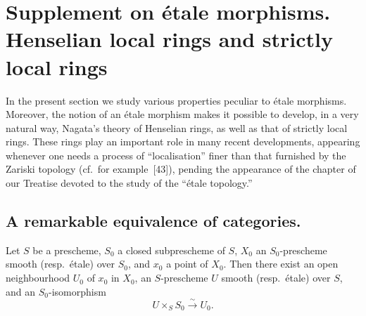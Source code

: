 \section{Supplement on \'etale morphisms. Henselian local rings and strictly local rings}
\label{section:IV.18}

In the present section we study various properties peculiar to \'etale morphisms.  Moreover, the notion of an \'etale morphism makes it possible to develop, in a very natural way, Nagata's theory of Henselian rings, as well as that of strictly local rings.  These rings play an important role in many recent developments, appearing whenever one needs a process of ``localisation'' finer than that furnished by the Zariski topology (cf.\ for example~[43]), pending the appearance of the chapter of our Treatise devoted to the study of the ``\'etale topology.''

\subsection{A remarkable equivalence of categories.}
\label{subsection:IV.18.1}

\begin{proposition}[18.1.1]
\label{IV.18.1.1}
Let $S$ be a prescheme, $S_0$ a closed subprescheme of $S$, $X_0$ an $S_0$-prescheme smooth \textup{(resp.}\ \'etale\textup{)} over $S_0$, and $x_0$ a point of $X_0$.  Then there exist an open neighbourhood $U_0$ of $x_0$ in $X_0$, an $S$-prescheme $U$ smooth \textup{(resp.}\ \'etale\textup{)} over $S$, and an $S_0$-isomorphism
\[
 U\times_SS_0\xrightarrow{\sim}U_0.
\]
\end{proposition}

